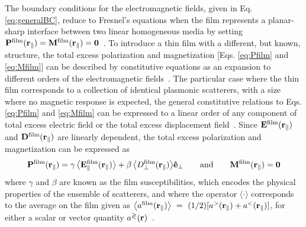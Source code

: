 The boundary conditions for the electromagnetic fields, given in Eq. \eqref{eq:generalBC}, reduce to Fresnel’s equations when the film represents a planar-sharp interface between two linear homogeneous media by setting $\vb{P}^\text{film}(\vb{r}_\parallel) = \vb{M}^\text{film}(\vb{r}_\parallel) = \vb{0}$~\cite{bedeaux_optical_2004}. To introduce a thin film with a different, but known, structure, the total excess polarization and magnetization [Eqs. \eqref{eq:Pfilm} and \eqref{eq:Mfilm}] can be described by constitutive equations as an expansion to different orders of the electromagnetic fields~\cite{bedeaux_optical_2004}. The particular case where the thin film corresponds to a collection of identical plasmonic scatterers, with a size where no magnetic response is expected, the general constitutive relations to Eqs.  \eqref{eq:Pfilm} and \eqref{eq:Mfilm}  can be expressed to a linear order of any component of total excess electric field or the total excess displacement field~\cite{lazzari_granfilm_2002,haarmans_optical_1995}. Since $\vb{E}^\text{film}(\vb{r}_\parallel)$ and $\vb{D}^\text{film}(\vb{r}_\parallel)$ are linearly dependent, the total excess polarization and magnetization can be expressed as~\cite{bedeaux_optical_2004,lazzari_granfilm_2002}
%
\begin{align}
	\vb{P}^\text{film}(\vb{r}_\parallel) = 
			\gamma\,\big\langle\vb{E}^\text{film}_\parallel(\vb{r}_\parallel)\big\rangle +
			\beta \,\big\langle {D}^\text{film}_\perp(\vb{r}_\parallel)\big\rangle \vu{e}_\perp
	\qquad\text{and}\qquad
	\vb{M}^\text{film}(\vb{r}_\parallel) = \vb{0}
\label{eq:P-TFT}
\end{align}
%
where $\gamma$ and $\beta$ are known as the film susceptibilities, which encodes the physical properties of the ensemble of scatterers, and where the operator $\langle\cdot\rangle$ corresponds to the average on the film given as $\big\langle a^\text{film} (\vb{r}_\parallel)\big\rangle~=~(1/2)[a^>(\vb{r}_\parallel) + a^<(\vb{r}_\parallel)]$, for either a scalar or vector quantity $a^\gtrless(\vb{r})$~\cite{lazzari_granfilm_2002,bedeaux_optical_2004}.

